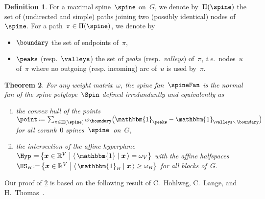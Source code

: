 \documentclass{amsart}
\newtheorem{theorem}{Theorem}[section]
\theoremstyle{definition}
\newtheorem{definition}[theorem]{Definition}
\newcommand{\R}{\mathbb{R}} %
\renewcommand{\b}[1]{{\boldsymbol{#1}}} %
\newcommand{\bigset}[2]{\big\{ #1 \;\big|\; #2 \big\}} %
\newcommand{\ssm}{\smallsetminus} %
\newcommand{\dotprod}[2]{\langle \, #1 \; | \; #2 \, \rangle} %
\newcommand{\one}{\mathbbm{1}} %
\newcommand{\eqdef}{\mbox{\,\raisebox{0.2ex}{\scriptsize\ensuremath{\mathrm:}}\ensuremath{=}\,}} %
\newcommand{\ie}{\textit{i.e.}~} %
\newcommand{\darkblue}{\color{darkblue}} %
\newcommand{\defn}[1]{\textsl{\darkblue #1}} %
\newcommand{\vertexSet}{V}
\newcommand{\weight}{\omega} %
\begin{document}
\begin{definition}
  For a maximal spine~$\spine$ on~$G$, we denote by~$\Pi(\spine)$ the set of (undirected and simple) paths joining two (possibly identical) nodes of~$\spine$.
  For a path~$\pi \in \Pi(\spine)$, we denote by
  \begin{itemize}
    \item $\boundary$ the set of endpoints of~$\pi$, %
    \item $\peaks$ (resp.~$\valleys$) the set of \defn{peaks} (resp.~\defn{valleys}) of~$\pi$, \ie nodes~$u$ of~$\pi$ where no outgoing (resp. incoming) arc of~$u$ is used by~$\pi$.
  \end{itemize}
\end{definition}

\begin{theorem}
  \label{thm:permutreehedra}
  For any weight matrix~$\weight$, the spine fan~$\spineFan$ is the normal fan of the \defn{spine polytope}~$\Spin$ defined irredundantly and equivalently as
  \begin{enumerate}[(i)]
    \item the convex hull of the points~$\point \eqdef \sum_{\pi \in \Pi(\spine)} \weight_{\boundary} \big( \one_{\peaks} - \one_{\valleys \ssm \boundary} \big)$ for all corank~$0$ spines~$\spine$~on~$G$,
    \item the intersection of the affine hyperplane~$\Hyp \eqdef \bigset{\b{x} \in \R^{\vertexSet}}{\dotprod{\one}{\b{x}} = \weight_{\vertexSet}}$ with the affine halfspaces~$\HS_B \eqdef \bigset{\b{x} \in \R^{\vertexSet}}{\dotprod{\one_B}{\b{x}} \ge \weight_B}$ for all blocks of~$G$.
  \end{enumerate}
\end{theorem}

Our proof of \cref{thm:permutreehedra} is based on the following result of C.~Hohlweg, C.~Lange, and H.~Thomas~\cite{HohlwegLangeThomas}.
\end{document}
